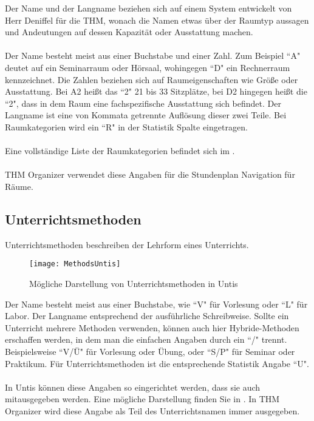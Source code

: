 Der Name und der Langname beziehen sich auf einem System entwickelt von Herr Deniffel für die THM, wonach die Namen etwas über der Raumtyp aussagen und Andeutungen auf dessen Kapazität oder Ausstattung machen.\\
\\
Der Name besteht meist aus einer Buchstabe und einer Zahl. Zum Beispiel ``A" deutet auf ein Seminarraum oder Hörsaal, wohingegen ``D" ein Rechnerraum kennzeichnet. Die Zahlen beziehen sich auf Raumeigenschaften wie Größe oder Ausstattung. Bei A2 heißt das ``2" 21 bis 33 Sitzplätze, bei D2 hingegen heißt die ``2", dass in dem Raum eine fachspezifische Ausstattung sich befindet. Der Langname ist eine von Kommata getrennte Auflösung dieser zwei Teile. Bei Raumkategorien wird ein ``R" in der Statistik Spalte eingetragen.\\
\\
Eine vollständige Liste der Raumkategorien befindet sich im .\\
\\
THM Organizer verwendet diese Angaben für die Stundenplan Navigation für Räume.\\

\subsection{Unterrichtsmethoden}

Unterrichtsmethoden beschreiben der Lehrform eines Unterrichts.\\

\begin{wrapfigure}{r}{0.35\textwidth}
	\vspace{-14pt}
	\texttt{[image: MethodsUntis]}
	\vspace{-5pt}
	\caption{Mögliche Darstellung von Unterrichtsmethoden in Untis}
	\label{fig:methoden-untis}
	\vspace{-5pt}
\end{wrapfigure}

\noindent
Der Name besteht meist aus einer Buchstabe, wie ``V" für Vorlesung oder ``L" für Labor. Der Langname entsprechend der ausführliche Schreibweise. Sollte ein Unterricht mehrere Methoden verwenden, können auch hier Hybride-Methoden erschaffen werden, in dem man die einfachen Angaben durch ein ``/" trennt. Beispielsweise ``V/Ü"  für Vorlesung oder Übung, oder ``S/P" für Seminar oder Praktikum. Für Unterrichtsmethoden ist die entsprechende Statistik Angabe ``U".\\
\\
In Untis können diese Angaben so eingerichtet werden, dass sie auch mitausgegeben werden. Eine mögliche Darstellung finden Sie in . In THM Organizer wird diese Angabe als Teil des Unterrichtsnamen immer ausgegeben.\\

